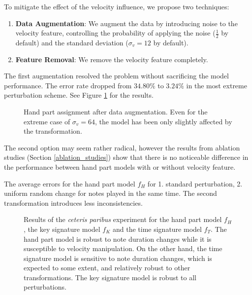 To mitigate the effect of the velocity influence, we propose two techniques: \begin{enumerate}
	\item {\bf Data Augmentation}: We augment the data by introducing noise to the velocity feature, controlling the probability of applying the noise ($\tfrac{1}{2}$ by default) and the standard deviation ($\sigma_v = 12$ by default).
	\item {\bf Feature Removal}: We remove the velocity feature completely.
\end{enumerate}

The first augmentation resolved the problem without sacrificing the model performance. The error rate dropped from $34.80\%$ to $3.24\%$ in the most extreme perturbation scheme. See Figure \ref{ceteris_paribus_h_augmentation} for the results.

\begin{figure}[ht!]
\centering

\caption[Hand part assignment after data augmentation.]{Hand part assignment after data augmentation. Even for the extreme case of $\sigma_v = 64$, the model has been only slightly affected by the transformation.}
\label{ceteris_paribus_h_augmentation}
\end{figure}

The second option may seem rather radical, however the results from ablation studies (Section \ref{ablation_studies}) show that there is no noticeable difference in the performance between hand part models with or without velocity feature.

\begin{table}[ht!]

\caption[The average errors for the hand part model.]{The average errors for the hand part model $f_H$ for 1. standard perturbation, 2. uniform random change for notes played in the same time. The second transformation introduces less inconsistencies.}
\label{hand_part_perturbations}
\end{table} 

\begin{figure}[ht!]
\centering



\caption[Results of the \emph{ceteris paribus} experiment.]{Results of the \emph{ceteris paribus} experiment for the hand part model $f_H$, the key signature model $f_K$ and the time signature model $f_T$. The hand part model is robust to note duration changes while it is susceptible to velocity manipulation. On the other hand, the time signature model is sensitive to note duration changes, which is expected to some extent, and relatively robust to other transformations. The key signature model is robust to all perturbations.}
\label{ceteris_paribus}
\end{figure}

